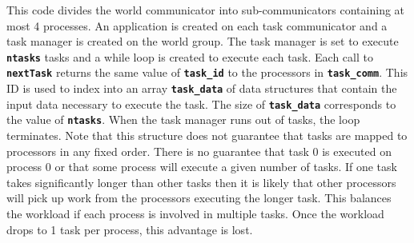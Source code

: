 This code divides the world communicator into sub-communicators containing at most 4 processes. An application is created on each task communicator and a task manager is created on the world group. The task manager is set to execute \texttt{\textbf{ntasks}} tasks and a while loop is created to execute each task. Each call to \texttt{\textbf{nextTask}} returns the same value of \texttt{\textbf{task\_id}} to the processors in \texttt{\textbf{task\_comm}}. This ID is used to index into an array \texttt{\textbf{task\_data}} of data structures that contain the input data necessary to execute the task. The size of \texttt{\textbf{task\_data}} corresponds to the value of \texttt{\textbf{ntasks}}. When the task manager runs out of tasks, the loop terminates. Note that this structure does not guarantee that tasks are mapped to processors in any fixed order. There is no guarantee that task 0 is executed on process 0 or that some process will execute a given number of tasks. If one task takes significantly longer than other tasks then it is likely that other processors will pick up work from the processors executing the longer task. This balances the workload if each process is involved in multiple tasks. Once the workload drops to 1 task per process, this advantage is lost.
